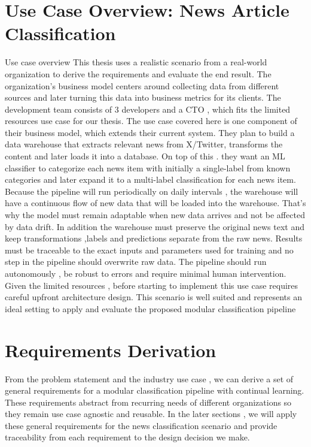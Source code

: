 \section{Use Case Overview: News Article Classification}
Use case overview
This thesis uses a realistic scenario from a real-world organization to derive the requirements and evaluate the end result. The organization’s business model centers around collecting data from different sources and later turning this data into business metrics for its clients. The development team consists of 3 developers and a CTO , which fits the limited resources use case for our thesis. The use case covered here is one component of their business model, which extends their current system. They plan to build a data warehouse that extracts relevant news from X/Twitter, transforms the content and later loads it into a database. On top of this . they want an ML classifier to categorize each news item with initially a single-label from known categories and later expand it to a multi-label classification for each news item. Because the pipeline will run periodically on daily intervals , the warehouse will have a continuous flow of new data that will be loaded into the warehouse. That's why the model must remain adaptable when new data arrives and not be affected by data drift. In addition the warehouse must preserve the original news text and keep transformations ,labels and predictions separate from the raw news. Results must be traceable to the exact inputs and parameters used for training and no step in the pipeline should overwrite raw data. The pipeline should run autonomously , be robust to errors and require minimal human intervention. Given the limited resources , before starting to implement this use case requires careful upfront architecture design. This scenario is well suited and represents an ideal setting to apply and evaluate the proposed modular classification pipeline

\section{Requirements Derivation}
From the problem statement and the industry use case , we can derive a set of general requirements for a modular classification pipeline with continual learning. These requirements abstract from recurring needs of different organizations so they remain use case agnostic and reusable. In the later sections , we will apply these general requirements for the news classification scenario and provide traceability from each requirement to the design decision we make.


